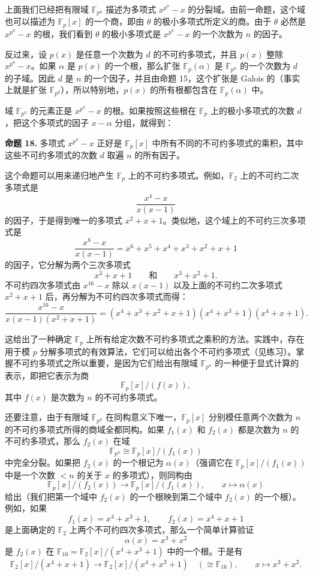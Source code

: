 上面我们已经把有限域 $\mathbb F_{p^n}$ 描述为多项式 $x^{p^n}-x$ 的分裂域。由前一命题，这个域也可以描述为 $\mathbb F_p[x]$ 的一个商，即由 $\theta$ 的极小多项式所定义的商。由于 $\theta$ 必然是 $x^{p^n}-x$ 的根，我们看到 $\theta$ 的极小多项式是 $x^{p^n}-x$ 的一个次数为 $n$ 的因子。

反过来，设 $p(x)$ 是任意一个次数为 $d$ 的不可约多项式，并且 $p(x)$ 整除 $x^{p^n}-x$。如果 $\alpha$ 是 $p(x)$ 的一个根，那么扩张 $\mathbb F_p(\alpha)$ 是 $\mathbb F_{p^n}$ 的一个次数为 $d$ 的子域。因此 $d$ 是 $n$ 的一个因子，并且由命题 15，这个扩张是 Galois 的（事实上就是扩张 $\mathbb F_{p^d}$），所以特别地，$p(x)$ 的所有根都包含在 $\mathbb F_p(\alpha)$ 中。

域 $\mathbb F_{p^n}$ 的元素正是 $x^{p^n}-x$ 的根。如果按照这些根在 $\mathbb F_p$ 上的极小多项式的次数 $d$，把这个多项式的因子 $x-\alpha$ 分组，就得到：

\noindent\textbf{命题 18.} 多项式 $x^{p^n}-x$ 正好是 $\mathbb F_p[x]$ 中所有不同的不可约多项式的乘积，其中这些不可约多项式的次数 $d$ 取遍 $n$ 的所有因子。

这个命题可以用来递归地产生 $\mathbb F_p$ 上的不可约多项式。例如，$\mathbb F_2$ 上的不可约二次多项式是
\[
\frac{x^4-x}{x(x-1)}
\]
的因子，于是得到唯一的多项式 $x^2+x+1$。类似地，这个域上的不可约三次多项式是
\[
\frac{x^8-x}{x(x-1)}=x^6+x^5+x^4+x^3+x^2+x+1
\]
的因子，它分解为两个三次多项式
\[
x^3+x+1\qquad\text{和}\qquad x^3+x^2+1.
\]
不可约四次多项式由 $x^{16}-x$ 除以 $x(x-1)$ 以及上面的不可约二次多项式 $x^2+x+1$ 后，再分解为不可约四次多项式而得：
\[
\frac{x^{16}-x}{x(x-1)(x^2+x+1)}
=(x^4+x^3+x^2+x+1)(x^4+x^3+1)(x^4+x+1).
\]

这给出了一种确定 $\mathbb F_p$ 上所有给定次数不可约多项式之乘积的方法。实践中，存在用于模 $p$ 分解多项式的有效算法，它们可以给出各个不可约多项式（见练习）。掌握不可约多项式之所以重要，是因为它们给出有限域 $\mathbb F_{p^n}$ 的一种便于显式计算的表示，即把它表示为商
\[
\mathbb F_p[x]/(f(x)),
\]
其中 $f(x)$ 是次数为 $n$ 的不可约多项式。

还要注意，由于有限域 $\mathbb F_{p^n}$ 在同构意义下唯一，$\mathbb F_p[x]$ 分别模任意两个次数为 $n$ 的不可约多项式所得的商域全都同构。如果 $f_1(x)$ 和 $f_2(x)$ 都是次数为 $n$ 的不可约多项式，那么 $f_2(x)$ 在域
\[
\mathbb F_{p^n}\cong \mathbb F_p[x]/(f_1(x))
\]
中完全分裂。如果把 $f_2(x)$ 的一个根记为 $\alpha(x)$（强调它在 $\mathbb F_p[x]/(f_1(x))$ 中是一个次数 $<n$ 的关于 $x$ 的多项式），则同构由
\[
\mathbb F_p[x]/(f_2(x))\longrightarrow \mathbb F_p[x]/(f_1(x)),
\qquad
x\longmapsto \alpha(x)
\]
给出（我们把第一个域中 $f_2(x)$ 的一个根映到第二个域中 $f_2(x)$ 的一个根）。例如，如果
\[
f_1(x)=x^4+x^3+1,
\qquad
f_2(x)=x^4+x+1
\]
是上面确定的 $\mathbb F_2$ 上两个不可约四次多项式，那么一个简单计算验证
\[
\alpha(x)=x^3+x^2
\]
是 $f_2(x)$ 在 $\mathbb F_{16}=\mathbb F_2[x]/(x^4+x^3+1)$ 中的一个根。于是有
\[
\mathbb F_2[x]/(x^4+x+1)\longrightarrow \mathbb F_2[x]/(x^4+x^3+1)\quad(\cong \mathbb F_{16}),
\qquad
x\longmapsto x^3+x^2.
\]

